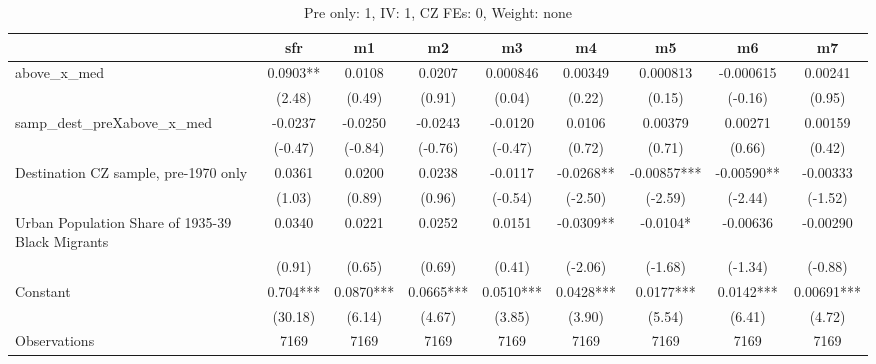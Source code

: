 \begin{table}[htbp]\centering
\def\sym#1{\ifmmode^{#1}\else\(^{#1}\)\fi}
\caption{Pre only: 1, IV: 1, CZ FEs: 0, Weight: none}
\begin{tabular}{l*{8}{c}}
\toprule
                    &\multicolumn{1}{c}{sfr}&\multicolumn{1}{c}{m1}&\multicolumn{1}{c}{m2}&\multicolumn{1}{c}{m3}&\multicolumn{1}{c}{m4}&\multicolumn{1}{c}{m5}&\multicolumn{1}{c}{m6}&\multicolumn{1}{c}{m7}\\
\midrule
above\_x\_med         &      0.0903** &      0.0108   &      0.0207   &    0.000846   &     0.00349   &    0.000813   &   -0.000615   &     0.00241   \\
                    &      (2.48)   &      (0.49)   &      (0.91)   &      (0.04)   &      (0.22)   &      (0.15)   &     (-0.16)   &      (0.95)   \\
\addlinespace
samp\_dest\_preXabove\_x\_med&     -0.0237   &     -0.0250   &     -0.0243   &     -0.0120   &      0.0106   &     0.00379   &     0.00271   &     0.00159   \\
                    &     (-0.47)   &     (-0.84)   &     (-0.76)   &     (-0.47)   &      (0.72)   &      (0.71)   &      (0.66)   &      (0.42)   \\
\addlinespace
Destination CZ sample, pre-1970 only&      0.0361   &      0.0200   &      0.0238   &     -0.0117   &     -0.0268** &    -0.00857***&    -0.00590** &    -0.00333   \\
                    &      (1.03)   &      (0.89)   &      (0.96)   &     (-0.54)   &     (-2.50)   &     (-2.59)   &     (-2.44)   &     (-1.52)   \\
\addlinespace
Urban Population Share of 1935-39 Black Migrants&      0.0340   &      0.0221   &      0.0252   &      0.0151   &     -0.0309** &     -0.0104*  &    -0.00636   &    -0.00290   \\
                    &      (0.91)   &      (0.65)   &      (0.69)   &      (0.41)   &     (-2.06)   &     (-1.68)   &     (-1.34)   &     (-0.88)   \\
\addlinespace
Constant            &       0.704***&      0.0870***&      0.0665***&      0.0510***&      0.0428***&      0.0177***&      0.0142***&     0.00691***\\
                    &     (30.18)   &      (6.14)   &      (4.67)   &      (3.85)   &      (3.90)   &      (5.54)   &      (6.41)   &      (4.72)   \\
\midrule
Observations        &        7169   &        7169   &        7169   &        7169   &        7169   &        7169   &        7169   &        7169   \\

\end{tabular}
\end{table}
